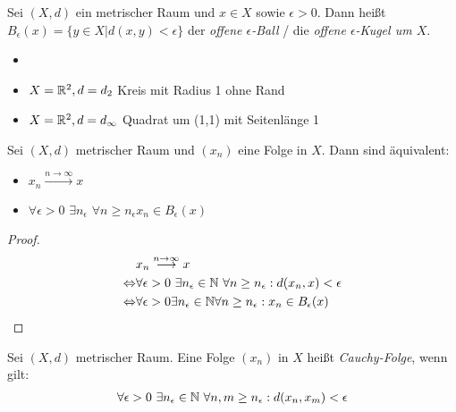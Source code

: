 \begin{Definition}{%
	Sei $(X,d)$ ein metrischer Raum und $x \in X$ sowie $\epsilon > 0$. Dann heißt 
	$B_\epsilon (x) = \{ y \in X \vert d(x,y) < \epsilon\}$ der \emph{offene 
	$\epsilon$-Ball} / die \emph{offene $\epsilon$-Kugel um $X$}.
}\end{Definition}

\begin{Beispiel}{
	\begin{itemize}
		\item[ ]
		\item $X = \mathbb{R}^2, d = d_2$ Kreis mit Radius 1 ohne Rand
		\item $X = \mathbb{R}^2, d = d_\infty$ Quadrat um (1,1) mit Seitenlänge 1
	\end{itemize}
}\end{Beispiel}

\begin{Lemma}{\label{vl_21_lemma_2}%
	Sei $(X,d)$ metrischer Raum und $(x_n)$ eine Folge in $X$. Dann sind äquivalent:
	\begin{itemize}
		\item $x_n \overset{n\rightarrow \infty}{\longrightarrow}x$
		\item $\forall \epsilon > 0$ $\exists n_\epsilon$ $\forall n \geq n_\epsilon  
			x_n \in B_\epsilon (x)$
	\end{itemize}
}\end{Lemma}

\begin{proof}
	\begin{align*}
		& x_n \overset{n\rightarrow \infty}{\longrightarrow} x \\
		\Leftrightarrow & \forall \epsilon > 0 
			\text{ }\exists n_\epsilon \in \mathbb{N} \text{ }\forall n \geq n_\epsilon: 
			d(x_n,x) < \epsilon \\
		\Leftrightarrow & \forall \epsilon > 0 \exists n_\epsilon \in \mathbb{N} \forall n \geq 
	n_\epsilon: x_n \in B_\epsilon(x)
	\end{align*} 
\end{proof}

\begin{Definition}[Einschub]{
	Sei $(X,d)$ metrischer Raum. Eine Folge $(x_n)$ in $X$ heißt \emph{Cauchy-Folge}, wenn gilt: 
	\begin{align*}
	\forall \epsilon > 0 \text{ } \exists n_\epsilon \in \mathbb{N} \text{ } \forall n, m 
		\geq n_\epsilon: d(x_n,x_m) < \epsilon
	\end{align*}
}\end{Definition}